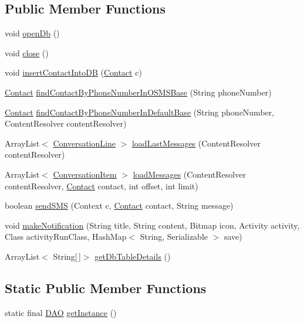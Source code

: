 \subsection*{Public Member Functions}
\begin{DoxyCompactItemize}
\item 
void \hyperlink{a00009_a0e9c1cf6abb64bc19b9c3bdec9eb750b}{open\+Db} ()
\item 
void \hyperlink{a00009_a5ae591df94fc66ccb85cbb6565368bca}{close} ()
\item 
void \hyperlink{a00009_a0d261830f979d2b82adddde282a4074d}{insert\+Contact\+Into\+D\+B} (\hyperlink{a00005}{Contact} c)
\item 
\hyperlink{a00005}{Contact} \hyperlink{a00009_a5eb135eeb76cb1557170dc43443b0c5d}{find\+Contact\+By\+Phone\+Number\+In\+O\+S\+M\+S\+Base} (String phone\+Number)
\item 
\hyperlink{a00005}{Contact} \hyperlink{a00009_ac877f70a0e827e3855b81178f5746b3a}{find\+Contact\+By\+Phone\+Number\+In\+Default\+Base} (String phone\+Number, Content\+Resolver content\+Resolver)
\item 
Array\+List$<$ \hyperlink{a00008}{Conversation\+Line} $>$ \hyperlink{a00009_a47fd191a6b728f32b3b232b836d97f1c}{load\+Last\+Messages} (Content\+Resolver content\+Resolver)
\item 
Array\+List$<$ \hyperlink{a00007}{Conversation\+Item} $>$ \hyperlink{a00009_acc6f8d4836ab29c22365b7f6e0763a15}{load\+Messages} (Content\+Resolver content\+Resolver, \hyperlink{a00005}{Contact} contact, int offset, int limit)
\item 
boolean \hyperlink{a00009_aefc9fb17466b37d1b0a6f37ecbcb9657}{send\+S\+M\+S} (Context c, \hyperlink{a00005}{Contact} contact, String message)
\item 
void \hyperlink{a00009_a056267ebf36c250c0b67cca3564ea3f9}{make\+Notification} (String title, String content, Bitmap icon, Activity activity, Class activity\+Run\+Class, Hash\+Map$<$ String, Serializable $>$ save)
\item 
Array\+List$<$ String\mbox{[}$\,$\mbox{]}$>$ \hyperlink{a00009_ad6830b697058550025465b603b1b254a}{get\+Db\+Table\+Details} ()
\end{DoxyCompactItemize}
\subsection*{Static Public Member Functions}
\begin{DoxyCompactItemize}
\item 
static final \hyperlink{a00009}{D\+A\+O} \hyperlink{a00009_a0d87654bfa9eb4fd33a79c470d4dc6f3}{get\+Instance} ()
\end{DoxyCompactItemize}
